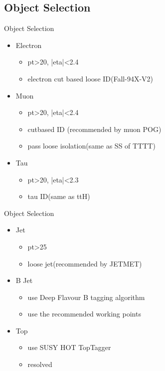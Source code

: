 \documentclass{beamer}
\begin{document}
\subsection{Object Selection}


\begin{frame}{Object Selection}
  \begin{itemize}
  \item
    Electron 
    \begin{itemize}
    \item
        pt>20, |eta|<2.4
    \item
        electron cut based loose ID(Fall-94X-V2)
    \end{itemize}
  \item
    Muon
    \begin{itemize}
    \item
        pt>20, |eta|<2.4
    \item
        cutbased ID (recommended by muon POG)
    \item
        pass loose isolation(same as SS of TTTT)
    \end{itemize}
  \item
    Tau
    \begin{itemize}
    \item
        pt>20, |eta|<2.3
    \item
        tau ID(same as ttH)
    \end{itemize}
  \end{itemize}
\end{frame}


\begin{frame}{Object Selection}
  \begin{itemize}
  \item
    Jet
    \begin{itemize}
    \item
        pt>25
    \item
        loose jet(recommended by JETMET)
    \end{itemize}
  \item
     B Jet
     \begin{itemize}
        \item
            use Deep Flavour B tagging algorithm 
        \item 
            use the recommended working points
     \end{itemize}
  \item
      Top 
    \begin{itemize}
    \item
        use SUSY HOT TopTagger 
    \item 
        resolved
    \end{itemize}

  \end{itemize}
\end{frame}
\end{document}
